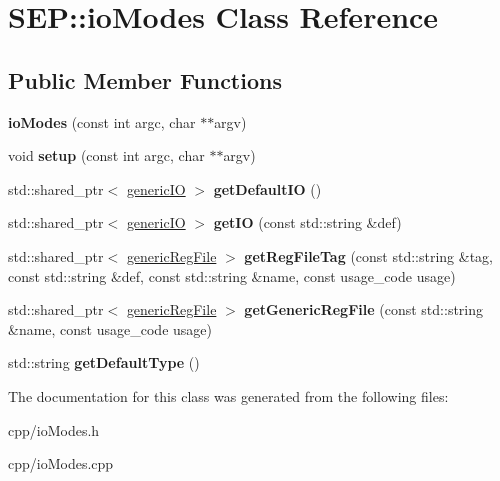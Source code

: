 \hypertarget{class_s_e_p_1_1io_modes}{}\section{S\+EP\+:\+:io\+Modes Class Reference}
\label{class_s_e_p_1_1io_modes}
\subsection*{Public Member Functions}
\begin{DoxyCompactItemize}
\item 
\mbox{\label{class_s_e_p_1_1io_modes_a190017ff0bb40211881b92dbd18c25a3}} 
{\bfseries io\+Modes} (const int argc, char $\ast$$\ast$argv)
\item 
\mbox{\label{class_s_e_p_1_1io_modes_aa4740d52cc9b97800f5948337ed9912b}} 
void {\bfseries setup} (const int argc, char $\ast$$\ast$argv)
\item 
\mbox{\label{class_s_e_p_1_1io_modes_a4d4a1feba562cd1ec7a841dceccea498}} 
std\+::shared\+\_\+ptr$<$ \hyperlink{class_s_e_p_1_1generic_i_o}{generic\+IO} $>$ {\bfseries get\+Default\+IO} ()
\item 
\mbox{\label{class_s_e_p_1_1io_modes_aba5e7c9362916a3e71f102305b4f5691}} 
std\+::shared\+\_\+ptr$<$ \hyperlink{class_s_e_p_1_1generic_i_o}{generic\+IO} $>$ {\bfseries get\+IO} (const std\+::string \&def)
\item 
\mbox{\label{class_s_e_p_1_1io_modes_af38d666f133f6c70af5b2510eb2d1ea8}} 
std\+::shared\+\_\+ptr$<$ \hyperlink{class_s_e_p_1_1generic_reg_file}{generic\+Reg\+File} $>$ {\bfseries get\+Reg\+File\+Tag} (const std\+::string \&tag, const std\+::string \&def, const std\+::string \&name, const usage\+\_\+code usage)
\item 
\mbox{\label{class_s_e_p_1_1io_modes_a8e76d83ecd55f80f008df771c521592c}} 
std\+::shared\+\_\+ptr$<$ \hyperlink{class_s_e_p_1_1generic_reg_file}{generic\+Reg\+File} $>$ {\bfseries get\+Generic\+Reg\+File} (const std\+::string \&name, const usage\+\_\+code usage)
\item 
\mbox{\label{class_s_e_p_1_1io_modes_a760d9b210a5a31130377c15adc98df60}} 
std\+::string {\bfseries get\+Default\+Type} ()
\end{DoxyCompactItemize}


The documentation for this class was generated from the following files\+:\begin{DoxyCompactItemize}
\item 
cpp/io\+Modes.\+h\item 
cpp/io\+Modes.\+cpp\end{DoxyCompactItemize}
